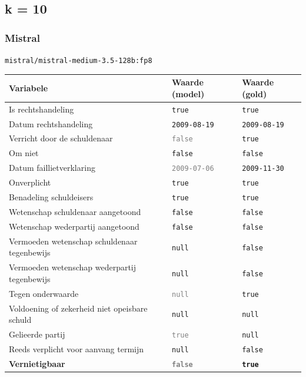 \documentclass[
  dutch,
  a4paper,
]{article}
\begin{document}
\newpage


\subsection{k = 10}\label{k-10-7}

\subsubsection{Mistral}\label{mistral-23}

\texttt{mistral/mistral-medium-3.5-128b:fp8}

\begin{center}
\small
\begin{tabular}{@{}p{7.4cm}p{2.6cm}p{2.6cm}@{}}
\toprule
Variabele & Waarde (model) & Waarde (gold) \\
\midrule
Is rechtshandeling & \texttt{true} & \texttt{true} \\
Datum rechtshandeling & \texttt{2009-08-19} & \texttt{2009-08-19} \\
Verricht door de schuldenaar & \textcolor{gray}{\texttt{false}} & \texttt{true} \\
Om niet & \texttt{false} & \texttt{false} \\
Datum faillietverklaring & \textcolor{gray}{\texttt{2009-07-06}} & \texttt{2009-11-30} \\
Onverplicht & \texttt{true} & \texttt{true} \\
Benadeling schuldeisers & \texttt{true} & \texttt{true} \\
Wetenschap schuldenaar aangetoond & \texttt{false} & \texttt{false} \\
Wetenschap wederpartij aangetoond & \texttt{false} & \texttt{false} \\
Vermoeden wetenschap schuldenaar tegenbewijs & \texttt{null} & \texttt{false} \\
Vermoeden wetenschap wederpartij tegenbewijs & \texttt{null} & \texttt{false} \\
Tegen onderwaarde & \textcolor{gray}{\texttt{null}} & \texttt{true} \\
Voldoening of zekerheid niet opeisbare schuld & \texttt{null} & \texttt{null} \\
Gelieerde partij & \textcolor{gray}{\texttt{true}} & \texttt{null} \\
Reeds verplicht voor aanvang termijn & \texttt{null} & \texttt{false} \\
\textbf{Vernietigbaar} & \textbf{\textcolor{gray}{\texttt{false}}} & \textbf{\texttt{true}} \\
\bottomrule
\end{tabular}
\end{center}
\end{document}
